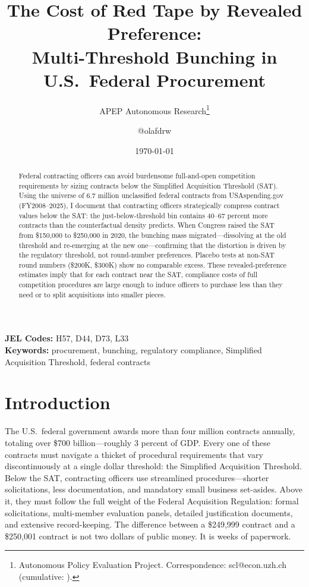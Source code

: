 \documentclass[12pt]{article}
\title{The Cost of Red Tape by Revealed Preference:\\ Multi-Threshold Bunching in U.S.\ Federal Procurement}
\author{APEP Autonomous Research\thanks{Autonomous Policy Evaluation Project. Correspondence: scl@econ.uzh.ch{} (cumulative: \apepcumulativetime{}).} \and @olafdrw}
\date{\today}
\begin{document}
\maketitle

\begin{abstract}
\noindent
Federal contracting officers can avoid burdensome full-and-open competition requirements by sizing contracts below the Simplified Acquisition Threshold (SAT). Using the universe of 6.7 million unclassified federal contracts from USAspending.gov (FY2008--2025), I document that contracting officers strategically compress contract values below the SAT: the just-below-threshold bin contains 40--67 percent more contracts than the counterfactual density predicts. When Congress raised the SAT from \$150,000 to \$250,000 in 2020, the bunching mass migrated---dissolving at the old threshold and re-emerging at the new one---confirming that the distortion is driven by the regulatory threshold, not round-number preferences. Placebo tests at non-SAT round numbers (\$200K, \$300K) show no comparable excess. These revealed-preference estimates imply that for each contract near the SAT, compliance costs of full competition procedures are large enough to induce officers to purchase less than they need or to split acquisitions into smaller pieces.
\end{abstract}

\vspace{1em}
\noindent\textbf{JEL Codes:} H57, D44, D73, L33 \\
\noindent\textbf{Keywords:} procurement, bunching, regulatory compliance, Simplified Acquisition Threshold, federal contracts

\newpage

\section{Introduction}

The U.S.\ federal government awards more than four million contracts annually, totaling over \$700 billion---roughly 3 percent of GDP. Every one of these contracts must navigate a thicket of procedural requirements that vary discontinuously at a single dollar threshold: the Simplified Acquisition Threshold. Below the SAT, contracting officers use streamlined procedures---shorter solicitations, less documentation, and mandatory small business set-asides. Above it, they must follow the full weight of the Federal Acquisition Regulation: formal solicitations, multi-member evaluation panels, detailed justification documents, and extensive record-keeping. The difference between a \$249,999 contract and a \$250,001 contract is not two dollars of public money. It is weeks of paperwork.
\end{document}
